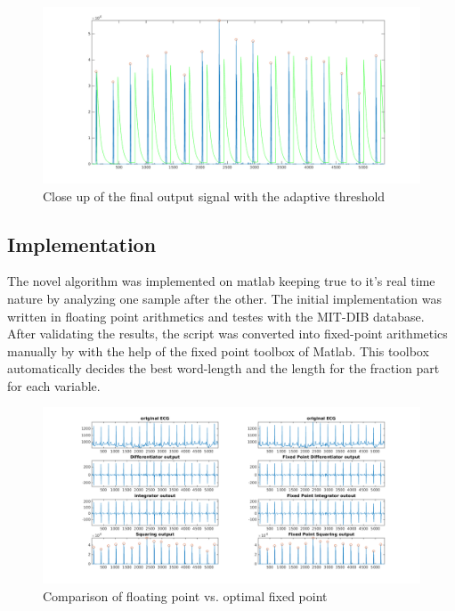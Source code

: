 \documentclass{article}
\begin{document}
\begin{figure}%
        \centerline{\includegraphics[scale=0.4]{./figs/rivas_closeup.png}}
        \caption{Close up of the final output signal with the adaptive threshold}
        \label{fig:rivasclose}
\end{figure}

\subsection{Implementation}

The novel algorithm was implemented on matlab keeping true to it's real time nature by analyzing one sample after the other. The initial implementation was written in floating point arithmetics and testes with the MIT-DIB database. After validating the results, the script was converted into fixed-point arithmetics manually by with the help of the fixed point toolbox of Matlab. This toolbox automatically decides the best word-length and the length for the fraction part for each variable. 

\begin{figure}%
        \centering
        \centerline{\includegraphics[scale=0.6]{./figs/comparison.png}}
        \caption{Comparison of floating point vs. optimal fixed point}
        \label{fig:rivas}
\end{figure}
\end{document}
